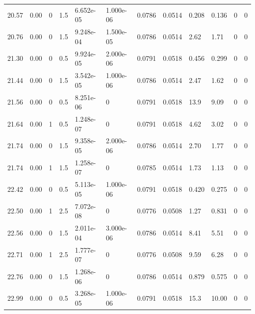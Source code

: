 \documentclass[preview]{standalone}
\begin{document}
{{{\begin{tabular}{L{1.2cm}C{1.2cm} C{0.3cm}C{0.5cm} C{1.4cm}C{1.4cm} C{1.4cm}C{1.4cm} C{1.6cm}C{1.6cm} C{1.6cm}C{1.6cm}}
  20.57  &  0.00  & 0     & 1.5 &  6.652e-05  & 1.000e-06  &  0.0786&   0.0514& 0.208 & 0.136   &  0 & 0  \\ 
  20.76  &  0.00  & 0     & 1.5 &  9.248e-04  & 1.500e-05  &  0.0786&   0.0514& 2.62 & 1.71   &  0 & 0  \\ 
  21.30  &  0.00  & 0     & 0.5 &  9.924e-05  & 2.000e-06  &  0.0791&   0.0518& 0.456 & 0.299   &  0 & 0  \\ 
  21.44  &  0.00  & 0     & 1.5 &  3.542e-05  & 1.000e-06  &  0.0786&   0.0514& 2.47 & 1.62   &  0 & 0  \\ 
  21.56  &  0.00  & 0     & 0.5 &  8.251e-06  & 0  &  0.0791&   0.0518& 13.9 & 9.09   &  0 & 0  \\ 
  21.64  &  0.00  & 1     & 0.5 &  1.248e-07  & 0  &  0.0791&   0.0518& 4.62 & 3.02   &  0 & 0  \\ 
  21.74  &  0.00  & 0     & 1.5 &  9.358e-05  & 2.000e-06  &  0.0786&   0.0514& 2.70 & 1.77   &  0 & 0  \\ 
  21.74  &  0.00  & 1     & 1.5 &  1.258e-07  & 0  &  0.0785&   0.0514& 1.73 & 1.13   &  0 & 0  \\ 
  22.42  &  0.00  & 0     & 0.5 &  5.113e-05  & 1.000e-06  &  0.0791&   0.0518& 0.420 & 0.275   &  0 & 0  \\ 
  22.50  &  0.00  & 1     & 2.5 &  7.072e-08  & 0  &  0.0776&   0.0508& 1.27 & 0.831   &  0 & 0  \\ 
  22.56  &  0.00  & 0     & 1.5 &  2.011e-04  & 3.000e-06  &  0.0786&   0.0514& 8.41 & 5.51   &  0 & 0  \\ 
  22.71  &  0.00  & 1     & 2.5 &  1.777e-07  & 0  &  0.0776&   0.0508& 9.59 & 6.28   &  0 & 0  \\ 
  22.76  &  0.00  & 0     & 1.5 &  1.268e-06  & 0  &  0.0786&   0.0514& 0.879 & 0.575   &  0 & 0  \\ 
  22.99  &  0.00  & 0     & 0.5 &  3.268e-05  & 1.000e-06  &  0.0791&   0.0518& 15.3 & 10.00   &  0 & 0  \\ 
\hline 
\end{tabular} 

}}}
\end{document}

